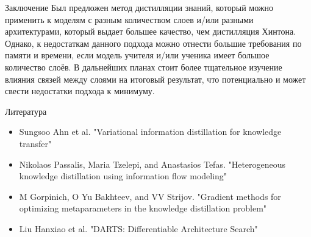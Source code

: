 \documentclass{beamer}
\begin{document}
\begin{frame}{Заключение}
    Был предложен метод дистилляции знаний, который можно применить к моделям с разным количеством слоев и/или разными архитектурами,
    который выдает большее качество, чем дистилляция Хинтона. Однако, к недостаткам данного подхода можно отнести большие требования по памяти и времени,
    если модель учителя и/или ученика имеет большое количество слоёв. В дальнейших планах стоит более тщательное изучение влияния связей между слоями на итоговый результат,
    что потенциально и может свести недостатки подхода к минимуму.
\end{frame}


\begin{frame}{Литература}
    \begin{itemize}
        \item Sungsoo Ahn et al. "Variational information distillation for knowledge transfer"
        \item Nikolaos Passalis, Maria Tzelepi, and Anastasios Tefas. "Heterogeneous knowledge distillation using
              information flow modeling"
        \item M Gorpinich, O Yu Bakhteev, and VV Strijov. "Gradient methods for optimizing metaparameters in the
              knowledge distillation problem"
        \item Liu Hanxiao et al. "DARTS: Differentiable Architecture Search"
    \end{itemize}
\end{frame}
\end{document}
